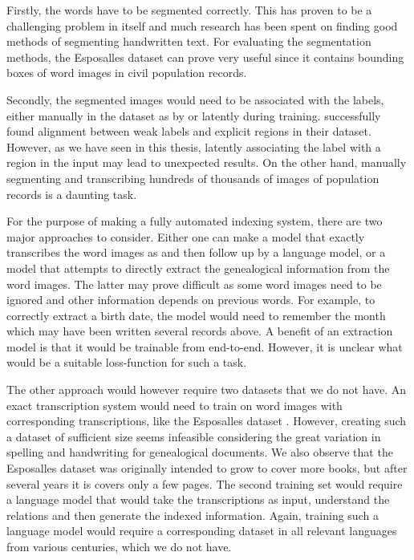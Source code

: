 Firstly, the words have to be segmented correctly. This has proven to be a challenging problem in itself and much research has been spent on finding good methods of segmenting handwritten text. For evaluating the segmentation methods, the Esposalles dataset \cite{esposalles} can prove very useful since it contains bounding boxes of word images in civil population records.

Secondly, the segmented images would need to be associated with the labels, either manually in the dataset as by \textcite{esposalles} or latently during training.
\textcite{VisualSemanticAlignment} successfully found alignment between weak labels and explicit regions in their dataset. However, as we have seen in this thesis, latently associating the label with a region in the input may lead to unexpected results. On the other hand, manually segmenting and transcribing hundreds of thousands of images of population records is a daunting task.

For the purpose of making a fully automated indexing system, there are two major approaches to consider. Either one can make a model that exactly transcribes the word images as \textcite{FornesCnnCategorization} and then follow up by a language model, or a model that attempts to directly extract the genealogical information from the word images. The latter may prove difficult as some word images need to be ignored and other information depends on previous words. For example, to correctly extract a birth date, the model would need to remember the month which may have been written several records above.
A benefit of an extraction model is that it would be trainable from end-to-end. However, it is unclear what would be a suitable loss-function for such a task.

The other approach would however require two datasets that we do not have. An exact transcription system would need to train on word images with corresponding transcriptions, like the Esposalles dataset \cite{esposalles}. However, creating such a dataset of sufficient size seems infeasible considering the great variation in spelling and handwriting for genealogical documents. We also observe that the Esposalles dataset was originally intended to grow to cover more books, but after several years it is covers only a few pages. The second training set would require a language model that would take the transcriptions as input, understand the relations and then generate the indexed information. Again, training such a language model would require a corresponding dataset in all relevant languages from various centuries, which we do not have.

